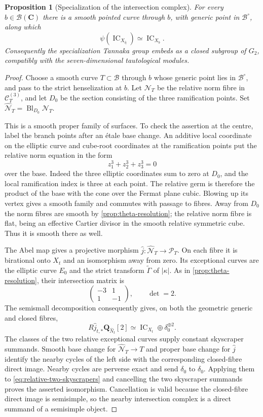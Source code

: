 \documentclass[10pt]{amsart}
\numberwithin{equation}{section}
\newtheorem{proposition}[theorem]{Proposition}
\theoremstyle{definition}
\theoremstyle{remark}
\newcommand{\CC}{\mathbf C}
\newcommand{\QQ}{\mathbf Q}
\newcommand{\IC}{\operatorname{IC}}
\newcommand{\cN}{\mathcal N}
\newcommand{\cB}{\mathcal B}
\newcommand{\cP}{\mathcal P}
\newcommand{\cC}{\mathcal C}
\newcommand{\wh}{\widehat}
\newcommand{\wt}{\widetilde}
\begin{document}
\begin{proposition}[Specialization of the intersection complex]
\label{prop:specialization}
For every $b\in\cB(\CC)$ there is a smooth pointed curve through $b$,
with generic point in $\cB^\circ$, along which
\[
 \psi(\IC_{X_{\bar\eta}})\simeq\IC_{X_b}.
\]
Consequently the specialization Tannaka group embeds as a closed subgroup
of $G_2$, compatibly with the seven-dimensional tautological modules.
\end{proposition}
\begin{proof}
Choose a smooth curve $T\subset\cB$ through $b$ whose generic point lies
in $\cB^\circ$, and pass to the strict henselization at $b$.
Let $\cN_T$ be the relative norm fibre in $\cC_T^{(3)}$, and let
$D_0$ be the section consisting of the three ramification points.
Set $\wh{\cN}_T=\operatorname{Bl}_{D_0}\cN_T$.

This is a smooth proper family of surfaces.  To check the assertion at
the centre, label the branch points after an \'etale base change.
An additive local coordinate on the elliptic curve and cube-root
coordinates at the ramification points put the relative norm equation
in the form
\[
 z_1^3+z_2^3+z_3^3=0
\]
over the base.  Indeed the three elliptic coordinates sum to zero at
$D_0$, and the local ramification index is three at each point.
The relative germ is therefore the product of the base with the cone
over the Fermat plane cubic.  Blowing up its vertex gives a smooth
family and commutes with passage to fibres.  Away from $D_0$ the norm
fibres are smooth by \cref{prop:theta-resolution}; the relative norm
fibre is flat, being an effective Cartier divisor in the smooth
relative symmetric cube.  Thus it is smooth there as well.

The Abel map gives a projective morphism
$\wh j:\wh{\cN}_T\to\cP_T$.  On each fibre it is birational onto $X_t$
and an isomorphism away from zero.  Its exceptional curves are the
elliptic curve $E_0$ and the strict transform $\wt\Gamma$ of $|\kappa|$.
As in \cref{prop:theta-resolution}, their intersection matrix is
\[
 \begin{pmatrix}-3&1\\1&-1\end{pmatrix},\qquad\det=2.
\]
The semismall decomposition consequently gives, on both the geometric
generic and closed fibres,
\begin{equation}\label{eq:relative-two-skyscrapers}
 R\wh j_{t,*}\QQ_{\wh N_t}[2]
       \simeq\IC_{X_t}\oplus\delta_0^{\oplus2}.
\end{equation}
The classes of the two relative exceptional curves supply constant
skyscraper summands.  Smooth base change for $\wh{\cN}_T\to T$ and
proper base change for $\wh j$ identify the nearby cycles of the left
side with the corresponding closed-fibre direct image.
Nearby cycles are perverse exact and send $\delta_0$ to $\delta_0$.
Applying them to \eqref{eq:relative-two-skyscrapers} and cancelling the
two skyscraper summands proves the asserted isomorphism.  Cancellation
is valid because the closed-fibre direct image is semisimple, so the
nearby intersection complex is a direct summand of a semisimple object.


\end{proof}
\end{document}
